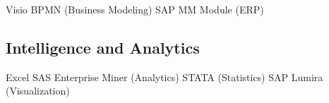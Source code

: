\documentclass[letterpaper]{deedy-resume} %
\begin{document}
\begin{minipage}[t]{0.33\textwidth}
Visio \textbullet{} BPMN (Business Modeling) \textbullet{} SAP MM Module (ERP)

\sectionspace %

\subsection{Intelligence and Analytics}
Excel \textbullet{} SAS Enterprise Miner (Analytics) \textbullet{} STATA (Statistics)\textbullet{} SAP Lumira (Visualization)

\sectionspace %


\end{minipage} %
\hfill
%
%
\end{document}
